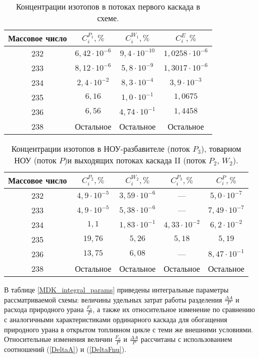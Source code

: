 \begin{table}[ht]
    \centering
    \caption{Концентрации изотопов в потоках первого каскада в схеме.}\label{MDKcas1params}
    \begin{tabular}{|c|c|c|c|}
        \hline Массовое число & $C_{i}^{P_{1}}, \%$ & $C_{i}^{W_{1}}, \%$ & $C_{i}^{E}, \%$\\\hline 
        232 & $6,42\cdot10^{-6}$ & $9,4\cdot10^{-10}$ & $1,0258\cdot10^{-6}$\\
        233 & $8,12\cdot10^{-6}$ & $5,8\cdot10^{-9}$ & $1,3017\cdot10^{-6}$\\
        234 & $2,4\cdot10^{-2}$ & $8,3\cdot10^{-4}$ & $3,9\cdot10^{-3}$\\
        235 & $6,16$ & $1,0\cdot10^{-1}$ & $1,0675$\\
        236 & $6,56$ & $4,74\cdot10^{-1}$ & $1,4458$\\
        238 & Остальное & Остальное & Остальное\\
        \hline
    \end{tabular}
\end{table}

\begin{table}[ht]
    \centering
    \caption{Концентрации изотопов в НОУ-разбавителе (поток $P_{3}$), товарном НОУ (поток $P$)и выходящих потоках каскада II (поток $P_{2}$, $W_{2}$).}\label{MDKcas2params}
    \begin{tabular}{|c|c|c|c|c|}
        \hline Массовое число & $C_{i}^{P_{2}}, \%$ & $C_{i}^{W_{2}}, \%$ & $C_{i}^{P_{3}}, \%$ & $C_{i}^{P}, \%$\\
        \hline 232 & $4,9\cdot10^{-5}$ & $3,59\cdot10^{-6}$ & --- & $5,0\cdot10^{-7}$\\
        233 & $4,9\cdot10^{-5}$ & $5,38\cdot10^{-6}$ & --- & $7,49\cdot10^{-7}$\\
        234 & $1,1$ & $1,83\cdot10^{-1}$ & $4,33\cdot10^{-2}$ & $6,2\cdot10^{-2}$\\
        235 & $19,76$ & $5,26$ & $5,18$  & $5,19$\\
        236 & $13,75$ & $6,08$ & ---  & $8,47\cdot10^{-1}$\\
        238 & Остальное & Остальное & Остальное  & Остальное\\
        \hline
\end{tabular}
\end{table}

В таблице \ref{MDK_integral_params} приведены интегральные параметры рассматриваемой схемы: величины удельных затрат работы разделения $\frac{\Delta A}{P}$ и расхода природного урана $\frac{F_n}{P}$, а также их относительное изменение по сравнению с аналогичными характеристиками ординарного каскада для обогащения природного урана в открытом топливном цикле с теми же внешними условиями. Относительные изменения величин $\frac{F_n}{P}$ и $\frac{\Delta A}{P}$ рассчитаны с использованием соотношений (\ref{DeltaA}) и (\ref{DeltaFnu}).

